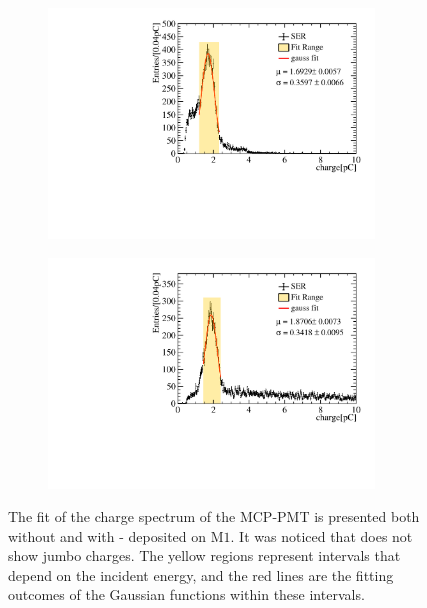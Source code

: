 \begin{figure}[!ht]
	\centering
	\begin{subfigure}[b]{0.5\textwidth}
		\centering
		\includegraphics[width=0.95\textwidth]{PMTRelated/GTmodel/fit_noald.pdf}
		\caption{}
		\label{fig:gain_noald}
	\end{subfigure}%
	\hfill
	\begin{subfigure}[b]{0.5\textwidth}
		\centering
		\includegraphics[width=0.95\textwidth]{PMTRelated/GTmodel/fit_ald.pdf}
		\caption{}
		\label{fig:gain_ald}
	\end{subfigure}

	\caption{The fit of the charge spectrum of the MCP-PMT is presented both without  and with  - deposited on $\mathrm{M}1$. It was noticed that  does not show jumbo charges. The yellow regions represent intervals that depend on the incident energy, and the red lines are the fitting outcomes of the Gaussian functions within these intervals.
	}
	\label{fig:gain_fit}
\end{figure}

